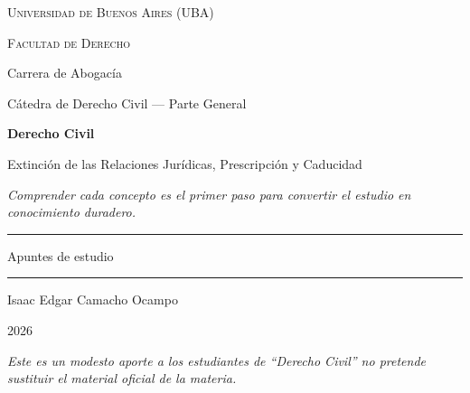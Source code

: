 \documentclass[12pt,oneside]{book}
\newcommand{\universidad}{Universidad de Buenos Aires (UBA)}
\newcommand{\facultad}{Facultad de Derecho}
\newcommand{\carrera}{Carrera de Abogacía}
\newcommand{\catedra}{Cátedra de Derecho Civil --- Parte General}
\newcommand{\materia}{Derecho Civil}
\newcommand{\titulo}{Extinción de las Relaciones Jurídicas, Prescripción y Caducidad}
\newcommand{\autor}{Isaac Edgar Camacho Ocampo}
\newcommand{\anio}{2026}
\begin{document}
\begin{titlepage}

\thispagestyle{empty}

\begin{center}

\vspace*{1cm}

{\large \textsc{\universidad}}

\vspace{0.2cm}

{\large \textsc{\facultad}}

\vspace{0.2cm}

{\large \carrera}

\vspace{0.2cm}

{\normalsize \catedra}

\vspace{2.5cm}

{\Huge \textbf{\materia}}

\vspace{1cm}

{\LARGE \titulo}

\vspace{0.8cm}

\textit{Comprender cada concepto es el primer paso para convertir el estudio en conocimiento duradero.}

\vspace{1.2cm}

\rule{0.70\textwidth}{0.5pt}

\vspace{0.5cm}

{\large Apuntes de estudio}

\vspace{0.5cm}

\rule{0.70\textwidth}{0.5pt}

\vfill

{\large \autor}

\vspace{0.3cm}

{\large \anio}

\end{center}

\vfill

\begin{flushleft}
\textit{Este es un modesto aporte a los estudiantes de ``Derecho Civil'' no pretende sustituir el material oficial de la materia.}
\end{flushleft}

\end{titlepage}
\end{document}
